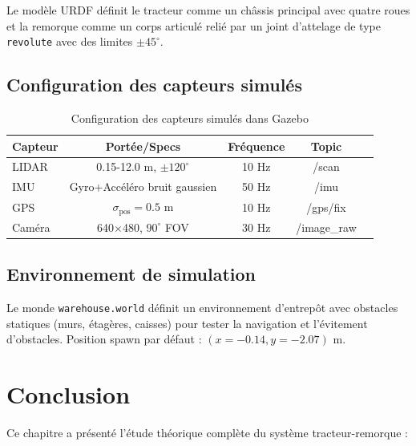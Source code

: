 \documentclass[a4paper,12pt]{report}
\begin{document}
Le modèle URDF définit le tracteur comme un châssis principal avec quatre roues et la remorque comme un corps articulé relié par un joint d'attelage de type \texttt{revolute} avec des limites $\pm 45^\circ$.

\subsection{Configuration des capteurs simulés}
\label{subsec:config_capteurs}

\begin{table}[htbp]
    \centering
    \begin{tabular}{lcccc}
        \toprule
        \textbf{Capteur} & \textbf{Portée/Specs} & \textbf{Fréquence} & \textbf{Topic} \\
        \midrule
        LIDAR & 0.15-12.0 m, $\pm 120^\circ$ & 10 Hz & /scan \\
        IMU & Gyro+Accéléro bruit gaussien & 50 Hz & /imu \\
        GPS & $\sigma_{\text{pos}} = 0.5$ m & 10 Hz & /gps/fix \\
        Caméra & 640$\times$480, $90^\circ$ FOV & 30 Hz & /image\_raw \\
        \bottomrule
    \end{tabular}
    \caption{Configuration des capteurs simulés dans Gazebo}
    \label{tab:config_capteurs}
\end{table}

\subsection{Environnement de simulation}
\label{subsec:environnement_sim}

Le monde \texttt{warehouse.world} définit un environnement d'entrepôt avec obstacles statiques (murs, étagères, caisses) pour tester la navigation et l'évitement d'obstacles. Position spawn par défaut : $(x=-0.14, y=-2.07)$ m.

\section*{Conclusion}

Ce chapitre a présenté l'étude théorique complète du système tracteur-remorque :
\end{document}
